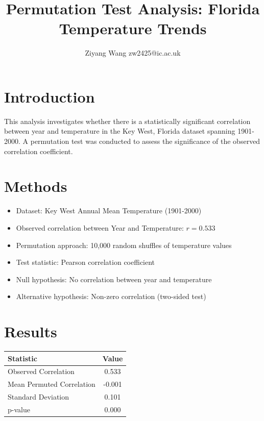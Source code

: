 \documentclass[10pt,a4paper]{article}
\title{Permutation Test Analysis: Florida Temperature Trends}
\author{Ziyang Wang zw2425@ic.ac.uk}
\date{}
\begin{document}
\maketitle

\section*{Introduction}
This analysis investigates whether there is a statistically significant correlation between year and temperature in the Key West, Florida dataset spanning 1901-2000. A permutation test was conducted to assess the significance of the observed correlation coefficient.

\section*{Methods}
\begin{itemize}
    \item Dataset: Key West Annual Mean Temperature (1901-2000)
    \item Observed correlation between Year and Temperature: $r = 0.533$
    \item Permutation approach: 10,000 random shuffles of temperature values
    \item Test statistic: Pearson correlation coefficient
    \item Null hypothesis: No correlation between year and temperature
    \item Alternative hypothesis: Non-zero correlation (two-sided test)
\end{itemize}

\section*{Results}
\begin{table}[h!]
\centering
\begin{tabular}{@{}lc@{}}
\toprule
\textbf{Statistic} & \textbf{Value} \\
\midrule
Observed Correlation & 0.533 \\
Mean Permuted Correlation & -0.001 \\
Standard Deviation & 0.101 \\
p-value & 0.000 \\
\bottomrule
\end{tabular}
\end{table}
\end{document}
